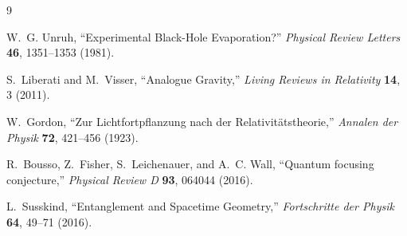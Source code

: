 \documentclass[11pt]{article}
\begin{document}
\begin{thebibliography}{9}

W.~G. Unruh,
``Experimental Black-Hole Evaporation?''
\emph{Physical Review Letters} \textbf{46}, 1351--1353 (1981).

S.~Liberati and M.~Visser,
``Analogue Gravity,''
\emph{Living Reviews in Relativity} \textbf{14}, 3 (2011).

W.~Gordon,
``Zur Lichtfortpflanzung nach der Relativit\"atstheorie,''
\emph{Annalen der Physik} \textbf{72}, 421--456 (1923).

R.~Bousso, Z.~Fisher, S.~Leichenauer, and A.~C. Wall,
``Quantum focusing conjecture,''
\emph{Physical Review D} \textbf{93}, 064044 (2016).

L.~Susskind,
``Entanglement and Spacetime Geometry,''
\emph{Fortschritte der Physik} \textbf{64}, 49--71 (2016).

\end{thebibliography}
\end{document}
